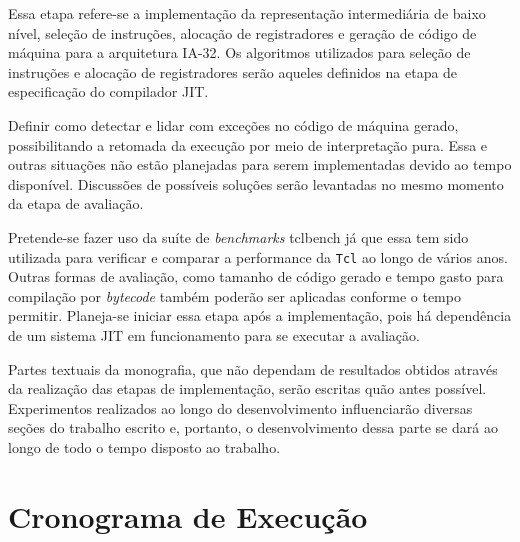 
Essa etapa refere-se a implementação da representação intermediária de
baixo nível, seleção de instruções, alocação de registradores e
geração de código de máquina para a arquitetura IA-32. Os algoritmos
utilizados para seleção de instruções e alocação de registradores
serão aqueles definidos na etapa de especificação do compilador JIT.



Definir como detectar e lidar com exceções no código de máquina gerado,
possibilitando a retomada da execução por meio de interpretação pura.
Essa e outras situações não estão planejadas para serem
implementadas devido ao tempo disponível. Discussões de possíveis
soluções serão levantadas no mesmo momento da etapa de avaliação.


Pretende-se fazer uso da suíte de \textit{benchmarks}
tclbench \cite{tcllib_bench} já que essa tem sido utilizada para verificar
e comparar a performance da \texttt{Tcl} ao longo de vários
anos. Outras formas de avaliação, como tamanho de código gerado e
tempo gasto para compilação por \textit{bytecode} também
poderão ser aplicadas conforme o tempo permitir. Planeja-se iniciar
essa etapa após a implementação, pois há dependência de um sistema JIT
em funcionamento para se executar a avaliação.


Partes textuais da monografia, que não dependam de resultados obtidos
através da realização das etapas de implementação, serão escritas quão
antes possível. Experimentos realizados ao longo do desenvolvimento
influenciarão diversas seções do trabalho escrito e, portanto, o
desenvolvimento dessa parte se dará ao longo de todo o tempo disposto
ao trabalho.


\section{Cronograma de Execução}

